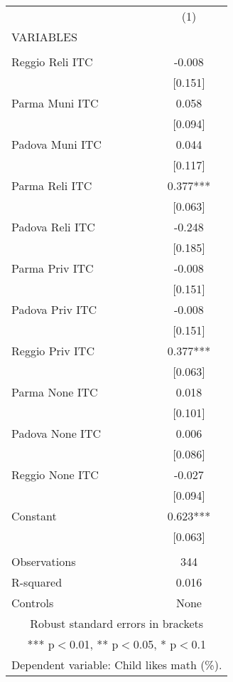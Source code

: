 \begin{tabular}{lc} \hline
 & (1) \\
VARIABLES &  \\ \hline
 &  \\
Reggio Reli ITC & -0.008 \\
 & [0.151] \\
Parma Muni ITC & 0.058 \\
 & [0.094] \\
Padova Muni ITC & 0.044 \\
 & [0.117] \\
Parma Reli ITC & 0.377*** \\
 & [0.063] \\
Padova Reli ITC & -0.248 \\
 & [0.185] \\
Parma Priv ITC & -0.008 \\
 & [0.151] \\
Padova Priv ITC & -0.008 \\
 & [0.151] \\
Reggio Priv ITC & 0.377*** \\
 & [0.063] \\
Parma None ITC & 0.018 \\
 & [0.101] \\
Padova None ITC & 0.006 \\
 & [0.086] \\
Reggio None ITC & -0.027 \\
 & [0.094] \\
Constant & 0.623*** \\
 & [0.063] \\
 &  \\
Observations & 344 \\
R-squared & 0.016 \\
 Controls & None \\ \hline
\multicolumn{2}{c}{ Robust standard errors in brackets} \\
\multicolumn{2}{c}{ *** p$<$0.01, ** p$<$0.05, * p$<$0.1} \\
\multicolumn{2}{c}{ Dependent variable: Child likes math (\%).} \\
\end{tabular}
